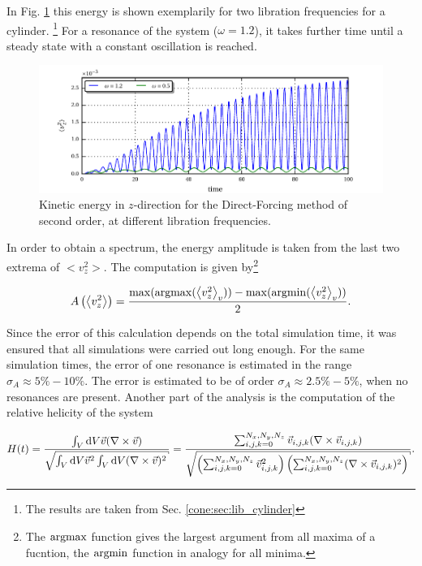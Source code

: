 In Fig. \ref{fig:cone:cyl_vzmode} this energy is shown exemplarily for two libration frequencies for a cylinder.
\footnote{The results are taken from Sec. \ref{cone:sec:lib_cylinder}}
For a resonance of the system ($\omega=1.2$), it takes further time until a steady state with a constant oscillation is reached.

\begin{figure}[!pb]
  \includegraphics{gfx/cone/cylinder/cyl_vz.pdf}
  \caption{Kinetic energy in $z$-direction for the Direct-Forcing method of second order, at different libration frequencies.
  \label{fig:cone:cyl_vzmode}
  }
\end{figure}
\clearpage

In order to obtain a spectrum, the energy amplitude is taken from the last two extrema of $<v_z^2>$.
The computation is given by\footnote{The $\operatorname*{argmax}$ function gives the largest argument from all maxima of a fucntion, the $\operatorname*{argmin}$ function in analogy for all minima.}

\begin{align}
    A\left(\left<v_z^2\right>\right) = \frac{\max(\operatorname*{argmax}(\left<v_z^2\right>_{v})) - \max(\operatorname*{argmin}(\left<v_z^2\right>_{v}))}{2}.
\end{align}

Since the error of this calculation depends on the total simulation time, it was ensured that all simulations
were carried out long enough.
For the same simulation times, the error of one resonance is estimated in the range $\sigma_A \approx 5\% - 10\%$.
The error is estimated to be of order $\sigma_A \approx 2.5\% - 5\%$, when no resonances are present.
Another part of the analysis is the computation of the relative helicity of the system

\begin{align}
H(t) = \frac{\int_V \dif V \vec{v} (\nabla \times \vec{v})}
{\sqrt{\int_V \dif V \vec{v}^2 \int_V \dif V (\nabla \times \vec{v})^2}}
 = \frac{\sum_{i,j,k=0}^{N_x, N_y, N_z} \vec{v}_{i,j,k} (\nabla \times \vec{v}_{i, j, k})}
 {\sqrt{\left(\sum_{i,j,k=0}^{N_x, N_y, N_z}\vec{v}_{i,j,k}^2\right)
 \left(\sum_{i,j,k=0}^{N_x, N_y, N_z}
  (\nabla \times \vec{v}_{i, j, k})^2\right)}}.
\end{align}

